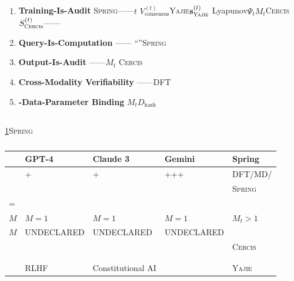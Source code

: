 \documentclass[12pt,a4paper]{article}
\theoremstyle{remark}
\newcommand{\Spring}{\textsc{Spring}}
\newcommand{\Yajie}{\textsc{Yajie}}
\newcommand{\Cercis}{\textsc{Cercis}}
\newcommand{\Lyap}{\ensuremath{\Psi}}
\begin{document}
\subsection{}



\begin{enumerate}[label=\textbf{ \arabic*},leftmargin=*,itemsep=5pt]
    \item \textbf{Training-Is-Audit}
    \Spring{}——$t$
    $V^{(t)}_{\text{consensus}}$\Yajie{}$\mathbf{s}^{(t)}_{\Yajie}$
    Lyapunov$\Lyap_t$$M_t$\Cercis{}$S^{(t)}_{\Cercis}$——
    
    
    \item \textbf{Query-Is-Computation}
    ——
    “”\Spring{}
    
    
    \item \textbf{Output-Is-Audit}
    ——$M_t$
    \Cercis{}
    
    \item \textbf{Cross-Modality Verifiability}
    ——DFT
    
    
    \item \textbf{-Data-Parameter Binding}
    $M_t$$D_{\text{hash}}$
\end{enumerate}

\subsection{}

\ref{tab:architecture_comparison}\Spring{}

\begin{table}[H]
\centering
\caption{}
\label{tab:architecture_comparison}
\renewcommand{\arraystretch}{1.4}
\small
\begin{tabular}{@{}p{1.8cm} p{2.2cm} p{2.2cm} p{2.2cm} p{3.0cm}@{}}
\toprule
\textbf{} & \textbf{GPT-4} & \textbf{Claude 3} & \textbf{Gemini} & \textbf{Spring} \\
\midrule
 & + & + & +++ & \textbf{}DFT/MD/ \\
\midrule
 &  &  &  & \textbf{}\Spring{} \\
\midrule
= &  &  &  & \textbf{} \\
\midrule
$M$ & $M=1$ & $M=1$ & $M=1$ & $M_t>1$ \\
\midrule
$M$ & UNDECLARED & UNDECLARED & UNDECLARED &  \\
\midrule
 &  &  &  & \Cercis{} \\
\midrule
 &  &  &  &  \\
\midrule
 &  &  &  &  \\
\midrule
 & RLHF & Constitutional AI &  & \textbf{}\Yajie{} \\
\bottomrule
\end{tabular}
\end{table}
\end{document}
